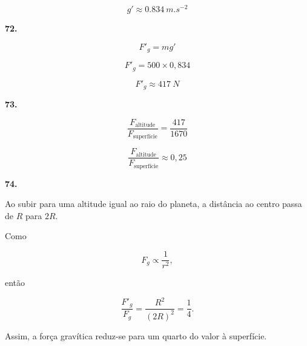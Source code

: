 \documentclass[11pt,a4paper]{article}
\begin{document}
\begin{solucaobox}[Questões 68--74]
		\[
		\boxed{
			g'\approx\SI{0.834}{m.s^{-2}}
		}
		\]
		
		\vspace{3mm}
		
		\textbf{72.}
		
		\[
		F'_g=mg'
		\]
		
		\[
		F'_g=
		500\times0{,}834
		\]
		
		\[
		\boxed{
			F'_g\approx\SI{417}{N}
		}
		\]
		
		\vspace{3mm}
		
		\textbf{73.}
		
		\[
		\frac{
			F_{\text{altitude}}
		}{
			F_{\text{superfície}}
		}
		=
		\frac{417}{1670}
		\]
		
		\[
		\boxed{
			\frac{
				F_{\text{altitude}}
			}{
				F_{\text{superfície}}
			}
			\approx0{,}25
		}
		\]
		
		\vspace{3mm}
		
		\textbf{74.}
		
		Ao subir para uma altitude igual ao raio do planeta, a distância ao centro
		passa de $R$ para $2R$.
		
		Como
		
		\[
		F_g\propto\frac1{r^2},
		\]
		
		então
		
		\[
		\frac{F'_g}{F_g}
		=
		\frac{R^2}{(2R)^2}
		=
		\frac14.
		\]
		
		Assim, a força gravítica reduz-se para um quarto do valor à superfície.
		
	\end{solucaobox}
	
	
	\clearpage
	
\end{document}

